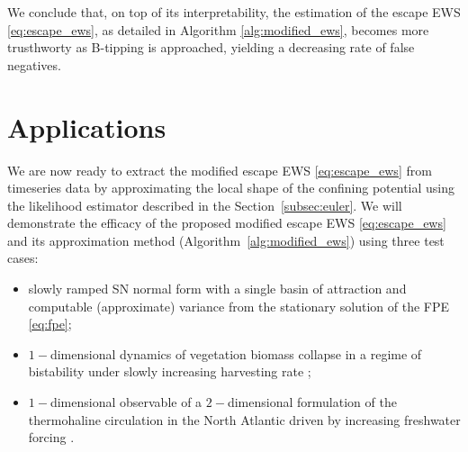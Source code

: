 \documentclass[10pt]{article}
\newcommand{\sref}[1]{Section~\ref{#1}}
\begin{document}
We conclude that, on top of its interpretability, the estimation of the escape EWS \eqref{eq:escape_ews}, as detailed in Algorithm \ref{alg:modified_ews}, becomes more trusthworty as B-tipping is approached, yielding a decreasing rate of false negatives.

\section{Applications}\label{sec:applications}
We are now ready to extract the modified escape EWS \eqref{eq:escape_ews} from timeseries data by approximating the local shape of the confining potential using the likelihood estimator described in the \sref{subsec:euler}.
We will demonstrate the efficacy of the proposed modified escape EWS \eqref{eq:escape_ews} and its approximation method (Algorithm~\ref{alg:modified_ews}) using three test cases:
%
\begin{itemize}
     \item slowly ramped SN normal form with a single basin of attraction and computable (approximate) variance from the stationary solution of the FPE \eqref{eq:fpe};
     \item $1-$dimensional dynamics of vegetation biomass collapse in a regime of bistability under slowly increasing harvesting rate \cite{May1977};
     \item $1-$dimensional observable of a $2-$dimensional formulation of the thermohaline circulation in the North Atlantic driven by increasing freshwater forcing \cite{Stommel1961}.
\end{itemize}
%
\end{document}
